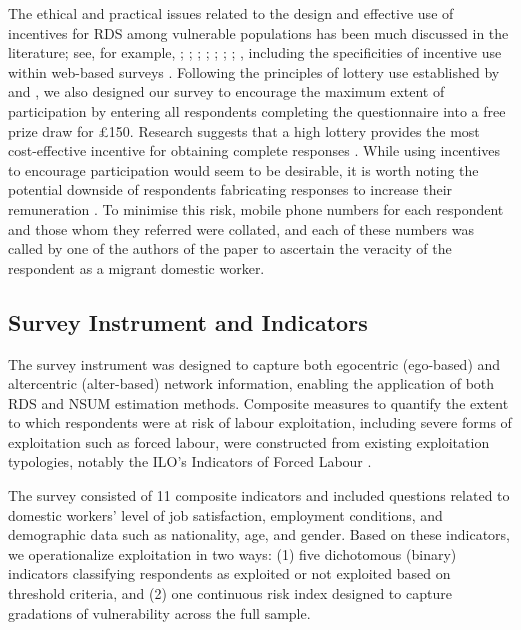 \documentclass[
  12pt,
  letterpaper,
  DIV=11,
  numbers=noendperiod]{scrartcl}
\theoremstyle{plain}
\theoremstyle{definition}
\begin{document}
The ethical and practical issues related to the design and effective use
of incentives for RDS among vulnerable populations has been much
discussed in the literature; see, for example,
\textcite{wang_respondent-driven_2005};
\textcite{abdul-quader_effectiveness_2006};
\textcite{singer_incentives_2006}; \textcite{dejong_ethical_2009};
\textcite{semaan_ethical_2009}; \textcite{brunovskis_untold_2010};
\textcite{semaan_time-space_2010}; \textcite{platt_adapting_2015},
including the specificities of incentive use within web-based surveys
\autocite{cobanoglu_effect_2003}. Following the principles of lottery
use established by \textcite{brown_you_2006} and
\textcite{laguilles_can_2011}, we also designed our survey to encourage
the maximum extent of participation by entering all respondents
completing the questionnaire into a free prize draw for £150. Research
suggests that a high lottery provides the most cost-effective incentive
for obtaining complete responses
\autocite{gajic_cost-effectiveness_2012}. While using incentives to
encourage participation would seem to be desirable, it is worth noting
the potential downside of respondents fabricating responses to increase
their remuneration \autocite{robinson_sampling_2014}. To minimise this
risk, mobile phone numbers for each respondent and those whom they
referred were collated, and each of these numbers was called by one of
the authors of the paper to ascertain the veracity of the respondent as
a migrant domestic worker.

\subsection{Survey Instrument and
Indicators}\label{survey-instrument-and-indicators}

The survey instrument was designed to capture both egocentric
(ego-based) and altercentric (alter-based) network information, enabling
the application of both RDS and NSUM estimation methods. Composite
measures to quantify the extent to which respondents were at risk of
labour exploitation, including severe forms of exploitation such as
forced labour, were constructed from existing exploitation typologies,
notably the ILO's Indicators of Forced Labour
\autocite{ILO11-indicators}.

The survey consisted of 11 composite indicators and included questions
related to domestic workers' level of job satisfaction, employment
conditions, and demographic data such as nationality, age, and gender.
Based on these indicators, we operationalize exploitation in two ways:
(1) five dichotomous (binary) indicators classifying respondents as
exploited or not exploited based on threshold criteria, and (2) one
continuous risk index designed to capture gradations of vulnerability
across the full sample.
\end{document}
